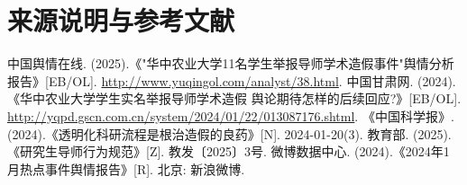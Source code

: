 \documentclass[12pt,a4paper]{article}
\begin{document}
\section{来源说明与参考文献}
\begin{thebibliography}{99}
     中国舆情在线. (2025).《"华中农业大学11名学生举报导师学术造假事件"舆情分析报告》[EB/OL]. \url{http://www.yuqingol.com/analyst/38.html}.
     中国甘肃网. (2024).《华中农业大学学生实名举报导师学术造假 舆论期待怎样的后续回应?》[EB/OL]. \url{http://yqpd.gscn.com.cn/system/2024/01/22/013087176.shtml}.
     《中国科学报》. (2024).《透明化科研流程是根治造假的良药》[N]. 2024-01-20(3).
     教育部. (2025).《研究生导师行为规范》[Z]. 教发〔2025〕3号.
     微博数据中心. (2024).《2024年1月热点事件舆情报告》[R]. 北京: 新浪微博.
\end{thebibliography}
\end{document}
